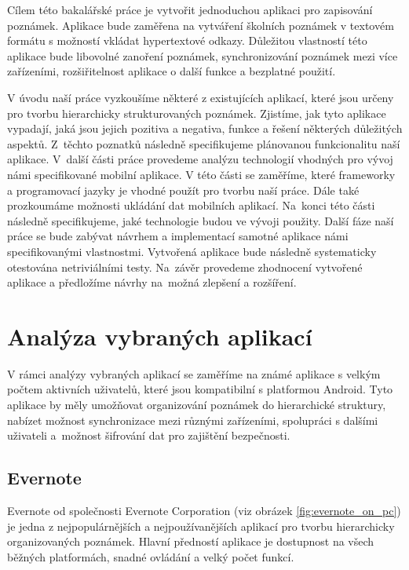 \documentclass[czech, bc, kiv, he, iso690numb]{fasthesis}
\begin{document}
Cílem této bakalářské práce je vytvořit jednoduchou aplikaci pro zapisování poznámek. Aplikace bude zaměřena na vytváření školních poznámek v textovém formátu s možností vkládat hypertextové odkazy. Důležitou vlastností této aplikace bude libovolné zanoření poznámek, synchronizování poznámek mezi více zařízeními, rozšiřitelnost aplikace o další funkce a bezplatné použití.

V úvodu naší práce vyzkoušíme některé z existujících aplikací, které jsou určeny pro tvorbu hierarchicky strukturovaných poznámek. Zjistíme, jak tyto aplikace vypadají, jaká jsou jejich pozitiva a negativa, funkce a řešení některých důležitých aspektů. Z~těchto poznatků následně specifikujeme plánovanou funkcionalitu naší aplikace. V~další části práce provedeme analýzu technologií vhodných pro vývoj námi specifikované mobilní aplikace. V této části se zaměříme, které frameworky a programovací jazyky je vhodné použít pro tvorbu naší práce. Dále také prozkoumáme možnosti ukládání dat mobilních aplikací. Na~konci této části následně specifikujeme, jaké technologie budou ve vývoji použity. Další fáze naší práce se bude zabývat návrhem a implementací samotné aplikace námi specifikovanými vlastnostmi. Vytvořená aplikace bude následně systematicky otestována netriviálními testy. Na~závěr provedeme zhodnocení vytvořené aplikace a předložíme návrhy na~možná zlepšení a rozšíření.


%
%
%
%
\chapter{Analýza vybraných aplikací}

V rámci analýzy vybraných aplikací se zaměříme na známé aplikace s velkým počtem aktivních uživatelů, které jsou kompatibilní s platformou Android. Tyto aplikace by měly umožňovat organizování poznámek do hierarchické struktury, nabízet možnost synchronizace mezi různými zařízeními, spolupráci s dalšími uživateli a~možnost šifrování dat pro zajištění bezpečnosti.

\section{Evernote}

Evernote od společnosti Evernote Corporation (viz obrázek \ref{fig:evernote_on_pc}) je jedna z nejpopulárnějších a nejpoužívanějších aplikací pro tvorbu hierarchicky organizovaných poznámek. Hlavní předností aplikace je dostupnost na všech běžných platformách, snadné ovládání a velký počet funkcí. \cite{evernote-website}
\end{document}
